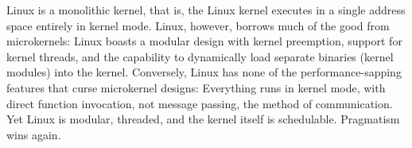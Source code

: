 \begin{description}
  Linux is a monolithic kernel, that is, the Linux kernel executes in a single address
  space entirely in kernel mode. Linux, however, borrows much of the good from
  microkernels: Linux boasts a modular design with kernel preemption, support for kernel
  threads, and the capability to dynamically load separate binaries (kernel modules) into
  the kernel. Conversely, Linux has none of the performance-sapping features that curse
  microkernel designs: Everything runs in kernel mode, with direct function invocation,
  not message passing, the method of communication. Yet Linux is modular, threaded, and
  the kernel itself is schedulable. Pragmatism wins again.\cite{love2010linux}
\end{description}




